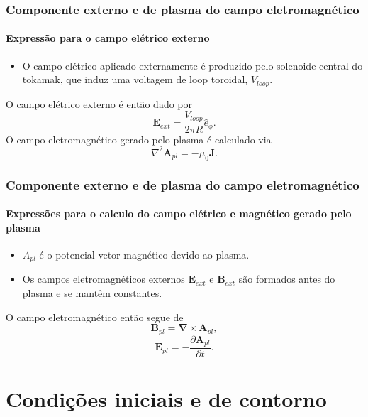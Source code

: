 \documentclass[aspectratio=169]{beamer}
\begin{document}
\begin{frame}		
\frametitle{Componente externo e de plasma do campo eletromagnético}
\framesubtitle{Expressão para o campo elétrico externo}
\begin{itemize}
\item O campo elétrico aplicado externamente é produzido pelo solenoide central do tokamak, que induz uma voltagem de loop toroidal, $V_{loop}$. 
\end{itemize}
O campo elétrico externo é então dado por
\begin{equation}
\label{Eext}
\bm{E}_{ext} = \frac{V_{loop}}{2\pi R} \hat{e}_{\phi} .
\end{equation}
O campo eletromagnético gerado pelo plasma é calculado via
\begin{equation}
\nabla^2 \bm{A}_{pl}=-\mu_0\bm{J}. 
\end{equation}
\end{frame}


\begin{frame}		
\frametitle{Componente externo e de plasma do campo eletromagnético}
\framesubtitle{Expressões para o calculo do campo elétrico e magnético gerado pelo plasma}
\begin{itemize}
\item $A_{pl}$ é o potencial vetor magnético devido ao plasma.
\item Os campos eletromagnéticos externos $\bm{E}_{ext}$ e $\bm{B}_{ext}$ são formados antes do plasma e se mantêm constantes.
\end{itemize}
 O campo eletromagnético então segue de
\begin{equation}
\bm{B}_{pl} = \bm{\nabla} \times \bm{A}_{pl},
\end{equation}
\begin{equation}
\bm{E}_{pl}=-\frac{\partial \bm{A}_{pl}}{\partial t} .
\end{equation}

\end{frame}


\section{Condições iniciais e de contorno}
\end{document}
